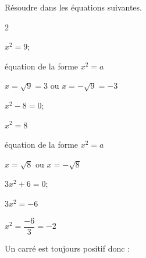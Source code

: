 \documentclass[11pt,a4paper]{article}  %
\begin{document}
Résoudre dans \R les équations suivantes.
\begin{multicols}{2}
	\begin{enumMet}
		\item $x^{2}=9$;
		\begin{corrBox}
			équation de la forme $x^{2}=a$
			
			$x=\sqrt{9}=3$ ou $x=-\sqrt{9}=-3$
			
		\end{corrBox}
		\item {} $x^{2}-8=0$;
		\begin{corrBox}
			$x^2=8$
			
			équation de la forme $x^{2}=a$
			
			$x=\sqrt{8}$ ou $x=-\sqrt{8}$
			
			\framebox{$S=\{-\sqrt{8}\ ;\ \sqrt{8}\}$}
		\end{corrBox}
		
		\item $3 x^{2}+6=0$;
		
		\begin{corrBox}
			$3x^2=-6$
			
			$x^2=\dfrac{-6}{3}=-2$		
			
			Un carré est toujours positif donc :
			
			\framebox{$S=\varnothing$}
		\end{corrBox}
	\end{enumMet}
\end{multicols}
\end{document}
